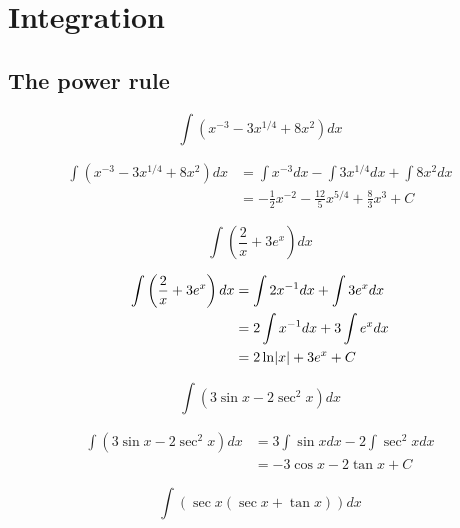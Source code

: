 \documentclass[a4paper, titlepage]{article}
\begin{document}
\section{Integration}

\subsection{The power rule}

\begin{Exercise}
\[\int \left( x^{-3} - 3x^{1/4} + 8x^2 \right) dx\]
\cite{anton-bivens-davis}
\end{Exercise}

\begin{Answer}
\begin{align*}
\int \left( x^{-3} - 3x^{1/4} + 8x^2 \right) dx
&= \int x^{-3} dx - \int 3x^{1/4} dx + \int 8x^2 dx \\
&= - \frac{1}{2}x^{-2} - \frac{12}{5}x^{5/4} + \frac{8}{3}x^3 + C
\end{align*}
\end{Answer}

\begin{Exercise}
\[\int \left( \frac{2}{x} + 3e^x \right) dx\]
\cite{anton-bivens-davis}
\end{Exercise}

\begin{Answer}
\begin{align*}
\int \left( \frac{2}{x} + 3e^x \right) dx
&= \int 2x^{-1} dx + \int 3e^x dx \\
&= 2 \int x^{-1} dx + 3 \int e^x dx \\
&= 2 \ln \abs{x} + 3 e^x + C
\end{align*}
\end{Answer}

\begin{Exercise}
\[\int \left( 3 \sin x - 2 \sec^2 x \right) dx\]
\cite{anton-bivens-davis}
\end{Exercise}

\begin{Answer}
\begin{align*}
\int \left( 3 \sin x - 2 \sec^2 x \right) dx
&= 3 \int \sin x dx - 2 \int \sec^2 x dx \\
&= - 3 \cos x - 2 \tan x + C
\end{align*}
\end{Answer}

\begin{Exercise}
    \[\int \left( \sec x \left( \sec x + \tan x \right) \right) dx\]
\cite{anton-bivens-davis}
\end{Exercise}
\end{document}

